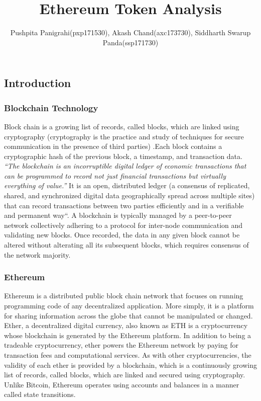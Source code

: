 \documentclass[]{article}
\title{Ethereum Token Analysis}
\author{Pushpita Panigrahi(pxp171530), Akash Chand(axc173730), Siddharth Swarup
Panda(ssp171730)}
\date{}
\begin{document}
\maketitle

\subsection{Introduction}\label{introduction}

\subsubsection{Blockchain Technology}\label{blockchain-technology}

Block chain is a growing list of records, called blocks, which are
linked using cryptography (cryptography is the practice and study of
techniques for secure communication in the presence of third parties)
.Each block contains a cryptographic hash of the previous block, a
timestamp, and transaction data. \emph{``The blockchain is an
incorruptible digital ledger of economic transactions that can be
programmed to record not just financial transactions but virtually
everything of value.''} It is an open, distributed ledger (a consensus
of replicated, shared, and synchronized digital data geographically
spread across multiple sites) that can record transactions between two
parties efficiently and in a verifiable and permanent way``. A
blockchain is typically managed by a peer-to-peer network collectively
adhering to a protocol for inter-node communication and validating new
blocks. Once recorded, the data in any given block cannot be altered
without alterating all its subsequent blocks, which requires consensus
of the network majority.

\subsubsection{Ethereum}\label{ethereum}

Ethereum is a distributed public block chain network that focuses on
running programming code of any decentralized application. More simply,
it is a platform for sharing information across the globe that cannot be
manipulated or changed. Ether, a decentralized digital currency, also
known as ETH is a cryptocurrency whose blockchain is generated by the
Ethereum platform. In addition to being a tradeable cryptocurrency,
ether powers the Ethereum network by paying for transaction fees and
computational services. As with other cryptocurrencies, the validity of
each ether is provided by a blockchain, which is a continuously growing
list of records, called blocks, which are linked and secured using
cryptography. Unlike Bitcoin, Ethereum operates using accounts and
balances in a manner called state transitions.
\end{document}
